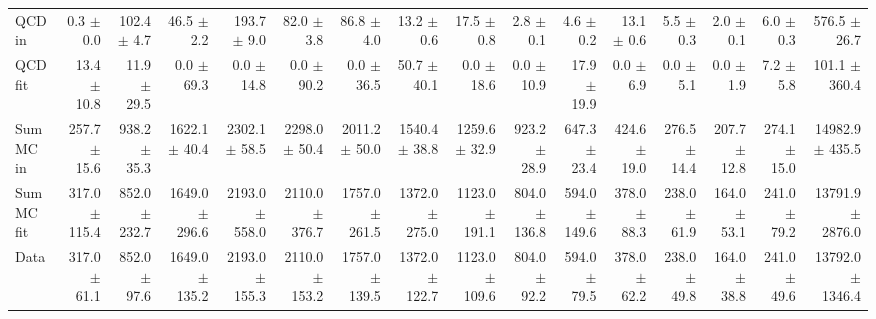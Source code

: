 \begin{table}[htbp]
{\begin{tabular}{lrrrrrrrrrrrrrrr}
\hline
QCD in & 0.3 $\pm$ 0.0 & 102.4 $\pm$ 4.7 & 46.5 $\pm$ 2.2 & 193.7 $\pm$ 9.0 & 82.0 $\pm$ 3.8 & 86.8 $\pm$ 4.0 & 13.2 $\pm$ 0.6 & 17.5 $\pm$ 0.8 & 2.8 $\pm$ 0.1 & 4.6 $\pm$ 0.2 & 13.1 $\pm$ 0.6 & 5.5 $\pm$ 0.3 & 2.0 $\pm$ 0.1 & 6.0 $\pm$ 0.3 & 576.5 $\pm$ 26.7 \\
QCD fit & 13.4 $\pm$ 10.8 & 11.9 $\pm$ 29.5 & 0.0 $\pm$ 69.3 & 0.0 $\pm$ 14.8 & 0.0 $\pm$ 90.2 & 0.0 $\pm$ 36.5 & 50.7 $\pm$ 40.1 & 0.0 $\pm$ 18.6 & 0.0 $\pm$ 10.9 & 17.9 $\pm$ 19.9 & 0.0 $\pm$ 6.9 & 0.0 $\pm$ 5.1 & 0.0 $\pm$ 1.9 & 7.2 $\pm$ 5.8 & 101.1 $\pm$ 360.4 \\
\hline
Sum MC in & 257.7 $\pm$ 15.6 & 938.2 $\pm$ 35.3 & 1622.1 $\pm$ 40.4 & 2302.1 $\pm$ 58.5 & 2298.0 $\pm$ 50.4 & 2011.2 $\pm$ 50.0 & 1540.4 $\pm$ 38.8 & 1259.6 $\pm$ 32.9 & 923.2 $\pm$ 28.9 & 647.3 $\pm$ 23.4 & 424.6 $\pm$ 19.0 & 276.5 $\pm$ 14.4 & 207.7 $\pm$ 12.8 & 274.1 $\pm$ 15.0& 14982.9 $\pm$ 435.5 \\
Sum MC fit & 317.0 $\pm$ 115.4 & 852.0 $\pm$ 232.7 & 1649.0 $\pm$ 296.6 & 2193.0 $\pm$ 558.0 & 2110.0 $\pm$ 376.7 & 1757.0 $\pm$ 261.5 & 1372.0 $\pm$ 275.0 & 1123.0 $\pm$ 191.1 & 804.0 $\pm$ 136.8 & 594.0 $\pm$ 149.6 & 378.0 $\pm$ 88.3 & 238.0 $\pm$ 61.9 & 164.0 $\pm$ 53.1 & 241.0 $\pm$ 79.2 & 13791.9 $\pm$ 2876.0 \\
\hline
Data & 317.0 $\pm$ 61.1 & 852.0 $\pm$ 97.6 & 1649.0 $\pm$ 135.2 & 2193.0 $\pm$ 155.3 & 2110.0 $\pm$ 153.2 & 1757.0 $\pm$ 139.5 & 1372.0 $\pm$ 122.7 & 1123.0 $\pm$ 109.6 & 804.0 $\pm$ 92.2 & 594.0 $\pm$ 79.5 & 378.0 $\pm$ 62.2 & 238.0 $\pm$ 49.8 & 164.0 $\pm$ 38.8 & 241.0 $\pm$ 49.6 & 13792.0 $\pm$ 1346.4 \\
\hline
\end{tabular}
}
\end{table}
